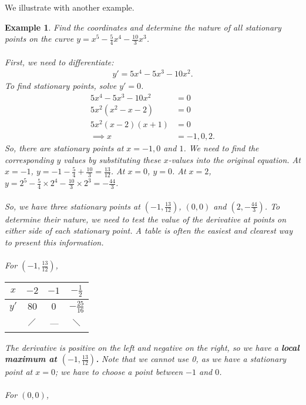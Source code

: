 \documentclass[a4paper,11pt]{article}
\newtheorem{example}{Example}
\begin{document}
\noindent We illustrate with another example. 
\pagebreak

\begin{example}\normalfont
	Find the coordinates and determine the nature of all stationary points on the curve $y=x^5-\frac{5}{4}x^4-\frac{10}{3}x^3$.\\\\
	First, we need to differentiate:
	\begin{align*}
		y' = 5x^4-5x^3-10x^2.
	\end{align*}
	To find stationary points, solve $y'=0$.
	\begin{align*}
		5x^4-5x^3-10x^2 &= 0\\
		5x^2\left(x^2-x-2\right) &= 0\\
		5x^2(x-2)(x+1) &= 0\\
		\implies x &= -1,0,2.
	\end{align*}
	So, there are stationary points at $x=-1,0$ and $1$. We need to find the corresponding $y$ values by substituting these $x$-values into the original equation. At $x=-1$, $y=-1-\frac{5}{4}+\frac{10}{3}= \frac{13}{12}$. At $x=0$, $y=0$. At $x=2$, $y=2^5-\frac{5}{4}\times2^4-\frac{10}{3}\times2^3= -\frac{44}{3}$.\\\\
	So, we have three stationary points at $(-1,\frac{13}{12})$, $(0,0)$ and $(2,-\frac{44}{3})$. To determine their nature, we need to test the value of the derivative at points on either side of each stationary point. A table is often the easiest and clearest way to present this information.\\\\
	For $(-1,\frac{13}{12})$, 
	{\renewcommand{\arraystretch}{1.5}%
	\begin{table}[H]\centering
		\begin{tabular}{c|c|c|c}
			$x$  &   $-2$    & $-1$ &  $-\frac{1}{2}$  \\ \hline
			$y'$ &   $80$    & $0$  & $-\frac{25}{16}$ \\
			 ~   & $\diagup$ & ---  &   $\diagdown$
		\end{tabular}
	\end{table}}
	The derivative is positive on the left and negative on the right, so we have a \textbf{local maximum at $(-1,\frac{13}{12})$.} Note that we cannot use 0, as we have a stationary point at $x=0$; we have to choose a point between $-1$ and $0$.\\\\
	For $(0,0)$, 
	{\renewcommand{\arraystretch}{1.5}%
}
\end{example}
\end{document}
